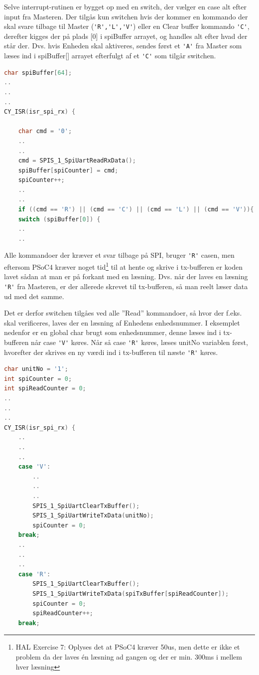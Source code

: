 Selve interrupt-rutinen er bygget op med en switch, der vælger en case alt efter input fra Masteren. Der tilgås kun switchen hvis der kommer en kommando der skal svare tilbage til Master (\verb+'R','L','V'+) eller en Clear buffer kommando \verb+'C'+, derefter kigges der på plads [0] i spiBuffer arrayet, og handles alt efter hvad der står der. Dvs. hvis Enheden skal aktiveres, sendes først et \verb+'A'+ fra Master som læses ind i spiBuffer[] arrayet efterfulgt af et \verb+'C'+ som tilgår switchen.
 
\begin{lstlisting}[language=C]
char spiBuffer[64];
..
..
..
CY_ISR(isr_spi_rx) {

	char cmd = '0';
	..
	.. 
	cmd = SPIS_1_SpiUartReadRxData();  
	spiBuffer[spiCounter] = cmd;
	spiCounter++;
	..
	..
	if ((cmd == 'R') || (cmd == 'C') || (cmd == 'L') || (cmd == 'V')){
	switch (spiBuffer[0]) {
	..
	..
\end{lstlisting}

Alle kommandoer der kræver et svar tilbage på SPI, bruger \verb+'R'+ casen, men eftersom PSoC4 kræver noget tid\footnote{HAL Exercise 7: Oplyses det at PSoC4 kræver 50us, men dette er ikke et problem da der laves én læsning ad gangen og der er min. 300ms i mellem hver læsning} til at hente og skrive i tx-bufferen er koden lavet sådan at man er på forkant med en læsning. Dvs. når der laves en læsning \verb+'R'+ fra Masteren, er der allerede skrevet til tx-bufferen, så man reelt læser data ud med det samme. 

Det er derfor switchen tilgåes ved alle ''Read'' kommandoer, så hvor der f.eks. skal verificeres, laves der en læsning af Enhedens enhedsnummer. I eksemplet nedenfor er en global char brugt som enhedsnummer, denne læses ind i tx-bufferen når case \verb+'V'+ køres. Når så case \verb+'R'+ køres, læses unitNo variablen først, hvorefter der skrives en ny værdi ind i tx-bufferen til næste \verb+'R'+ køres.


\begin{lstlisting}[language=C]
char unitNo = '1';
int spiCounter = 0;
int spiReadCounter = 0;
..
..
..
CY_ISR(isr_spi_rx) {
	..
	..
	..
	case 'V':
		..
		..
		..
		SPIS_1_SpiUartClearTxBuffer();
		SPIS_1_SpiUartWriteTxData(unitNo);
		spiCounter = 0;
	break;
	..
	..
	..
	case 'R':
		SPIS_1_SpiUartClearTxBuffer();
		SPIS_1_SpiUartWriteTxData(spiTxBuffer[spiReadCounter]);
		spiCounter = 0;
		spiReadCounter++;
	break;
\end{lstlisting}